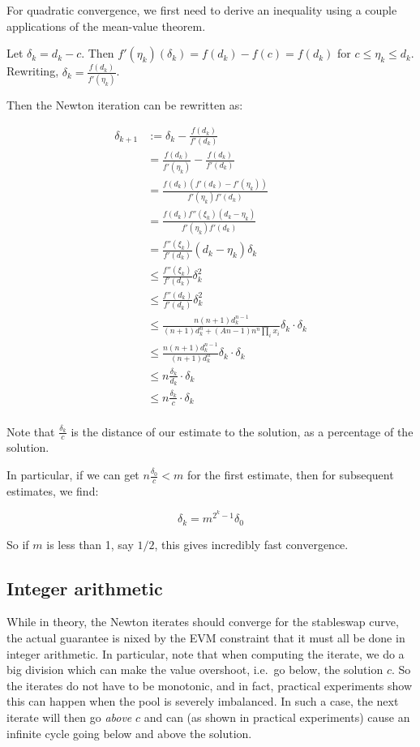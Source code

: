 \documentclass[
]{article}
\begin{document}
For quadratic convergence, we first need to derive an inequality using a
couple applications of the mean-value theorem.

Let \(\delta_k = d_k - c\). Then
\(f'(\eta_k) (\delta_k) = f(d_k) - f(c) = f(d_k)\) for
\(c\leq \eta_k \leq d_k\). Rewriting,
\(\delta_k = \frac{f(d_k)}{f'(\eta_k)}\).

Then the Newton iteration can be rewritten as:

\[\begin{aligned}
\delta_{k+1} &:= \delta_k - \frac{f(d_k)}{f'(d_k)} \\
&= \frac{f(d_k)}{f'(\eta_k)} - \frac{f(d_k)}{f'(d_k)} \\
&= \frac{ f(d_k) (f'(d_k) - f'(\eta_k)) }{f'(\eta_k) f'(d_k)} \\
&= \frac{ f(d_k) f''(\xi_k)(d_k - \eta_k)}{f'(\eta_k) f'(d_k)} \\
&= \frac{f''(\xi_k)}{f'(d_k)} (d_k - \eta_k) \delta_k\\
&\leq \frac{f''(\xi_k)}{f'(d_k)} \delta_k^2\\
&\leq \frac{f''(d_k)}{f'(d_k)} \delta_k^2\\
&\leq \frac{n (n+1) d_k^{n-1} }{(n+1) d_k^n + (An - 1) n^n \prod_i x_i  }\delta_k  \cdot \delta_k\\
&\leq \frac{n (n+1) d_k^{n-1} }{(n+1) d_k^n }\delta_k  \cdot \delta_k\\
&\leq n\frac{\delta_k}{d_k } \cdot \delta_k\\
&\leq n\frac{\delta_k}{c } \cdot \delta_k\\
\end{aligned}\]

Note that \(\frac{\delta_k}{c}\) is the distance of our estimate to the
solution, as a percentage of the solution.

In particular, if we can get \(n\frac{\delta_0}{c} < m\) for the first
estimate, then for subsequent estimates, we find:

\[ \delta_{k} = m^{2^k - 1} \delta_0\]

So if \(m\) is less than 1, say \(1/2\), this gives incredibly fast
convergence.

\hypertarget{integer-arithmetic}{%
\subsection{Integer arithmetic}\label{integer-arithmetic}}

While in theory, the Newton iterates should converge for the stableswap
curve, the actual guarantee is nixed by the EVM constraint that it must
all be done in integer arithmetic. In particular, note that when
computing the iterate, we do a big division which can make the value
overshoot, i.e.~go below, the solution \(c\). So the iterates do not
have to be monotonic, and in fact, practical experiments show this can
happen when the pool is severely imbalanced. In such a case, the next
iterate will then go \emph{above} \(c\) and can (as shown in practical
experiments) cause an infinite cycle going below and above the solution.
\end{document}
